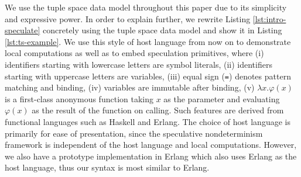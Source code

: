 We use the tuple space data model throughout this paper 
due to its simplicity and expressive power.
In order to explain further, we rewrite Listing \ref{lst:intro-speculate}
concretely using the tuple space data model and show it in Listing \ref{lst:ts-example}.
%
We use this style of host language from now on to 
demonstrate local computations as well as to embed speculation primitives, where
(i) identifiers starting with lowercase letters are symbol literals,
(ii) identifiers starting with uppercase letters are variables,
(iii) equal sign (\texttt{=}) denotes pattern matching and binding,
(iv) variables are immutable after binding,
(v) $\lambda x.\varphi(x)$ is a first-class anonymous function 
taking $x$ as the parameter and evaluating $\varphi(x)$ as 
the result of the function on calling. 
Such features are derived from functional languages such as Haskell and Erlang. 
The choice of host language is primarily for ease of presentation,
since the speculative nondeterminism framework is independent of 
the host language and local computations.
However, we also have a prototype implementation in Erlang which also uses
Erlang as the host language, thus our syntax is most similar to Erlang.
